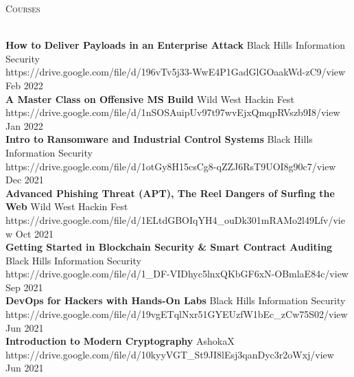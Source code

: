 \documentclass[a4paper]{article}
\newcommand{\lineunder} {
    \vspace*{-8pt} \\
    \hspace*{-18pt} \hrulefill \\
}
\newcommand{\header} [1] {
    {\hspace*{-18pt}\vspace*{6pt} \textsc{#1}}
    \vspace*{-6pt} \lineunder
}
\begin{document}
\header{Courses}
\vspace{1mm}

\textbf{How to Deliver Payloads in an Enterprise Attack} \hfill Black Hills Information Security\\
https://drive.google.com/file/d/196vTv5j33-WwE4P1GadGlGOaakWd-zC9/view \hfill Feb 2022\\
\vspace*{2.5mm}
\textbf{A Master Class on Offensive MS Build} \hfill Wild West Hackin\textquotesingle{} Fest\\
https://drive.google.com/file/d/1nSOSAuipUv97t97wvEjxQmqpRVszb9I8/view \hfill Jan 2022\\
\vspace*{2.5mm}
\textbf{Intro to Ransomware and Industrial Control Systems} \hfill Black Hills Information Security\\
https://drive.google.com/file/d/1otGy8H15csCg8-qZZJ6RsT9UOI8g90c7/view \hfill Dec 2021\\
\vspace*{2.5mm}
\textbf{Advanced Phishing Threat (APT), The Reel Dangers of Surfing the Web} \hfill Wild West Hackin\textquotesingle{} Fest\\
https://drive.google.com/file/d/1ELtdGBOIqYH4\_ouDk301mRAMo2l49Lfv/view \hfill Oct 2021\\
\vspace*{2.5mm}
\textbf{Getting Started in Blockchain Security \& Smart Contract Auditing} \hfill Black Hills Information Security\\
https://drive.google.com/file/d/1\_DF-VIDhyc5lnxQKbGF6xN-OBmlaE84c/view \hfill Sep 2021\\
\vspace*{2.5mm}
\textbf{DevOps for Hackers with Hands-On Labs} \hfill Black Hills Information Security\\
https://drive.google.com/file/d/19vgETqlNxr51GYEUzfW1bEc\_zCw75S02/view \hfill Jun 2021\\
\vspace*{2.5mm}
\textbf{Introduction to Modern Cryptography} \hfill AshokaX\\
https://drive.google.com/file/d/10kyyVGT_St9JI8lEsj3qanDyc3r2oWxj/view
\hfill Jun 2021\\
\vspace*{4mm}
\end{document}

